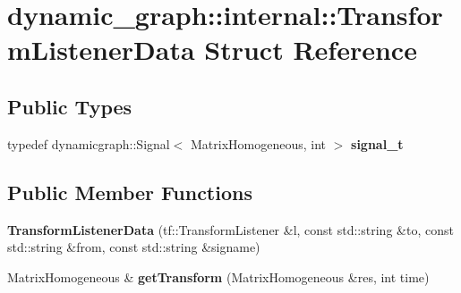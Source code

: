 \hypertarget{structdynamic__graph_1_1internal_1_1TransformListenerData}{}\section{dynamic\+\_\+graph\+:\+:internal\+:\+:Transform\+Listener\+Data Struct Reference}
\label{structdynamic__graph_1_1internal_1_1TransformListenerData}
\subsection*{Public Types}
\begin{DoxyCompactItemize}
\item 
\mbox{\label{structdynamic__graph_1_1internal_1_1TransformListenerData_ac6a6174f637f20a2fd08505f8384ffeb}} 
typedef dynamicgraph\+::\+Signal$<$ Matrix\+Homogeneous, int $>$ {\bfseries signal\+\_\+t}
\end{DoxyCompactItemize}
\subsection*{Public Member Functions}
\begin{DoxyCompactItemize}
\item 
\mbox{\label{structdynamic__graph_1_1internal_1_1TransformListenerData_aea741575414599c63429b551de15c17b}} 
{\bfseries Transform\+Listener\+Data} (tf\+::\+Transform\+Listener \&l, const std\+::string \&to, const std\+::string \&from, const std\+::string \&signame)
\item 
\mbox{\label{structdynamic__graph_1_1internal_1_1TransformListenerData_abbb4ba6133c60d3b39a1a078acce7bb2}} 
Matrix\+Homogeneous \& {\bfseries get\+Transform} (Matrix\+Homogeneous \&res, int time)
\end{DoxyCompactItemize}
